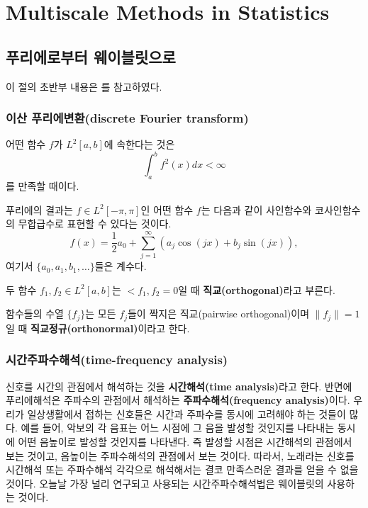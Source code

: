 \documentclass[b5paper,]{scrbook}
\theoremstyle{plain}
\theoremstyle{definition}
\numberwithin{equation}{section}
\let\BeginKnitrBlock\begin \let\EndKnitrBlock\end
\begin{document}
\part{Multiscale Methods in
Statistics}\label{part-multiscale-methods-in-statistics}

\chapter{푸리에로부터 웨이블릿으로}\label{fouriertowavelet}

이 절의 초반부 내용은 \citep{Ogden2012}를 참고하였다.

\section{이산 푸리에변환(discrete Fourier
transform)}\label{-discrete-fourier-transform}

\BeginKnitrBlock{definition}[L2]
\protect\hypertarget{def:unnamed-chunk-158}{}{\label{def:unnamed-chunk-158}
{} }어떤 함수 \(f\)가 \(L^{2}[a,b]\)에 속한다는 것은
\[\int_{a}^{b}f^{2}(x)dx <\infty\] 를 만족할 때이다.
\EndKnitrBlock{definition}

푸리에의 결과는 \(f\in L^{2}[-\pi, \pi]\)인 어떤 함수 \(f\)는 다음과
같이 사인함수와 코사인함수의 무합급수로 표현할 수 있다는 것이다.
\[f(x)=\frac{1}{2}a_{0}+\sum_{j=1}^{\infty}(a_{j}\cos (jx) + b_{j}\sin (jx)),\]
여기서 \(\{ a_{0}, a_{1}, b_{1}, \ldots \}\)들은 계수다.

\BeginKnitrBlock{definition}[직교]
\protect\hypertarget{def:unnamed-chunk-159}{}{\label{def:unnamed-chunk-159}
{} }두 함수 \(f_{1},f_{2}\in L^{2}[a,b]\)는
\(<f_{1},f_{2}=0\)일 때 \textbf{직교(orthogonal)}라고 부른다.
\EndKnitrBlock{definition}

\BeginKnitrBlock{definition}[직교정규]
\protect\hypertarget{def:unnamed-chunk-160}{}{\label{def:unnamed-chunk-160}
{} }함수들의 수열 \(\{ f_{j} \}\)는 모든
\(f_{j}\)들이 짝지은 직교(pairwise orthogonal)이며 \(\| f_{j}\|=1\)일 때
\textbf{직교정규(orthonormal)}이라고 한다.
\EndKnitrBlock{definition}

\section{시간주파수해석(time-frequency
analysis)}\label{time-frequency-analysis}

신호를 시간의 관점에서 해석하는 것을 \textbf{시간해석(time
analysis)}라고 한다. 반면에 푸리에해석은 주파수의 관점에서 해석하는
\textbf{주파수해석(frequency analysis)}이다. 우리가 일상생활에서 접하는
신호들은 시간과 주파수를 동시에 고려해야 하는 것들이 많다. 예를 들어,
악보의 각 음표는 어느 시점에 그 음을 발성할 것인지를 나타내는 동시에
어떤 음높이로 발성할 것인지를 나타낸다. 즉 발성할 시점은 시간해석의
관점에서 보는 것이고, 음높이는 주파수해석의 관점에서 보는 것이다.
따라서, 노래라는 신호를 시간해석 또는 주파수해석 각각으로 해석해서는
결코 만족스러운 결과를 얻을 수 없을 것이다. 오늘날 가장 널리 연구되고
사용되는 시간주파수해석법은 웨이블릿의 사용하는 것이다.
\end{document}
